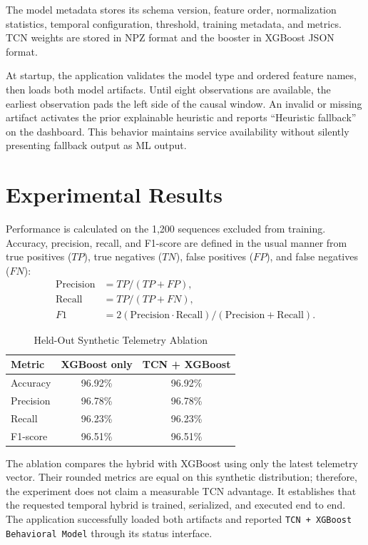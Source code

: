\documentclass[conference]{IEEEtran}
\begin{document}
The model metadata stores its schema version, feature order, normalization
statistics, temporal configuration, threshold, training metadata, and metrics.
TCN weights are stored in NPZ format and the booster in XGBoost JSON format.

At startup, the application validates the model type and ordered feature names,
then loads both model artifacts. Until eight observations are available, the
earliest observation pads the left side of the causal window.
An invalid or missing artifact activates the prior explainable heuristic and
reports ``Heuristic fallback'' on the dashboard. This behavior maintains service
availability without silently presenting fallback output as ML output.

\section{Experimental Results}
Performance is calculated on the 1,200 sequences excluded from training. Accuracy,
precision, recall, and F1-score are defined in the usual manner from true
positives ($TP$), true negatives ($TN$), false positives ($FP$), and false
negatives ($FN$):
\begin{align}
\text{Precision} &= TP/(TP+FP),\\
\text{Recall} &= TP/(TP+FN),\\
F1 &= 2(\text{Precision}\cdot\text{Recall})/
(\text{Precision}+\text{Recall}).
\end{align}

\begin{table}[t]
\caption{Held-Out Synthetic Telemetry Ablation}
\label{tab:results}
\centering
\begin{tabular}{lcc}
\toprule
Metric & XGBoost only & TCN + XGBoost \\
\midrule
Accuracy & 96.92\% & 96.92\% \\
Precision & 96.78\% & 96.78\% \\
Recall & 96.23\% & 96.23\% \\
F1-score & 96.51\% & 96.51\% \\
\bottomrule
\end{tabular}
\end{table}

The ablation compares the hybrid with XGBoost using only the latest telemetry
vector. Their rounded metrics are equal on this synthetic distribution; therefore,
the experiment does not claim a measurable TCN advantage. It establishes that the
requested temporal hybrid is trained, serialized, and executed end to end. The
application successfully loaded both artifacts and reported
\texttt{TCN + XGBoost Behavioral Model} through its status interface.
\end{document}
